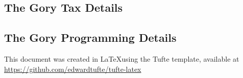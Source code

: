 \documentclass[a4paper, justified]{tufte-handout}
\newcommand{\hangp}[1]{\makebox[0pt][r]{(}#1\makebox[0pt][l]{)}}
\begin{document}
\subsection{The Gory Tax Details}

\subsection{The Gory Programming Details}


This document was created in \LaTeX using the Tufte template, available at \url{https://github.com/edwardtufte/tufte-latex}

\end{document}
